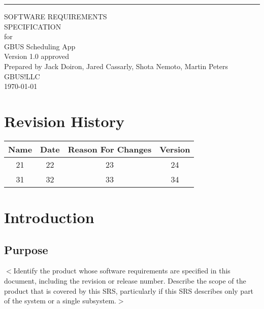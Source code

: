 \documentclass{scrreprt}
\date{}
\def\myversion{1.0 }
\begin{document}
\begin{flushright}
    \rule{16cm}{5pt}\vskip1cm
    \begin{bfseries}
        \Huge{SOFTWARE REQUIREMENTS\\ SPECIFICATION}\\
        \vspace{1.9cm}
        for\\
        \vspace{1.9cm}
        GBUS Scheduling App\\
        \vspace{1.9cm}
        \LARGE{Version \myversion approved}\\
        \vspace{1.9cm}
        Prepared by Jack Doiron, Jared Cassarly, Shota Nemoto, Martin Peters\\
        \vspace{1.9cm}
        GBUS!LLC\\
        \vspace{1.9cm}
        \today\\
    \end{bfseries}
\end{flushright}

\tableofcontents


\chapter*{Revision History}

\begin{center}
    \begin{tabular}{|c|c|c|c|}
        \hline
	    Name & Date & Reason For Changes & Version\\
        \hline
	    21 & 22 & 23 & 24\\
        \hline
	    31 & 32 & 33 & 34\\
        \hline
    \end{tabular}
\end{center}

\chapter{Introduction}

\section{Purpose}
$<$Identify the product whose software requirements are specified in this 
document, including the revision or release number. Describe the scope of the 
product that is covered by this SRS, particularly if this SRS describes only 
part of the system or a single subsystem.$>$
\end{document}
